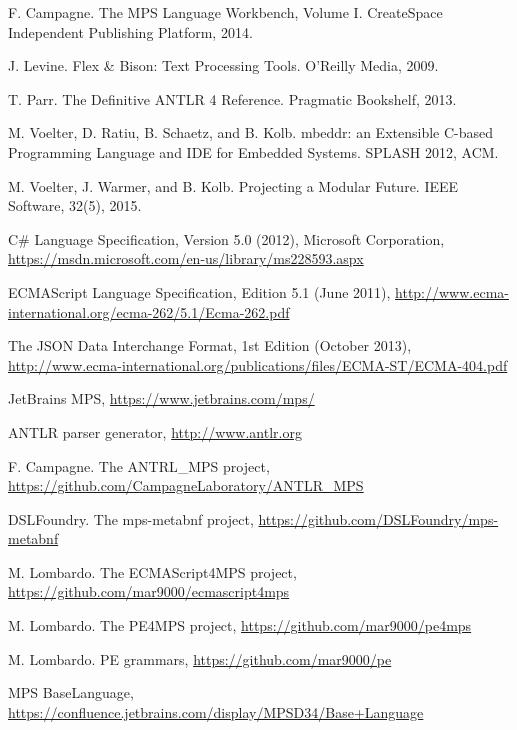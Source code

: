 \documentclass[sigplan,10pt,preprint]{acmart}
\begin{document}
\begin{thebibliography}{}

 F. Campagne. The MPS Language Workbench, Volume I. CreateSpace Independent Publishing Platform, 2014.

 J. Levine. Flex \& Bison: Text Processing Tools. O'Reilly Media, 2009.

 T. Parr. The Definitive ANTLR 4 Reference. Pragmatic Bookshelf, 2013.

 M. Voelter, D. Ratiu, B. Schaetz, and B. Kolb. mbeddr: an Extensible C-based Programming Language and IDE for Embedded Systems. SPLASH 2012, ACM.

 M. Voelter, J. Warmer, and B. Kolb. Projecting a Modular Future. IEEE Software, 32(5), 2015.

 C\# Language Specification, Version 5.0 (2012), Microsoft Corporation, \url{https://msdn.microsoft.com/en-us/library/ms228593.aspx}

 ECMAScript Language Specification, Edition 5.1 (June 2011), \url{http://www.ecma-international.org/ecma-262/5.1/Ecma-262.pdf}

 The JSON Data Interchange Format, 1st Edition (October 2013), \url{http://www.ecma-international.org/publications/files/ECMA-ST/ECMA-404.pdf}

 JetBrains MPS, \url{https://www.jetbrains.com/mps/}

 ANTLR parser generator, \url{http://www.antlr.org}

 F. Campagne. The ANTRL{\_}MPS project, \url{https://github.com/CampagneLaboratory/ANTLR_MPS}

 DSLFoundry. The mps-metabnf project, \url{https://github.com/DSLFoundry/mps-metabnf}

 M. Lombardo. The ECMAScript4MPS project, \url{https://github.com/mar9000/ecmascript4mps}

 M. Lombardo. The PE4MPS project, \url{https://github.com/mar9000/pe4mps}

 M. Lombardo. PE grammars, \url{https://github.com/mar9000/pe}

 MPS BaseLanguage, \url{https://confluence.jetbrains.com/display/MPSD34/Base+Language}

\end{thebibliography}
\end{document}
